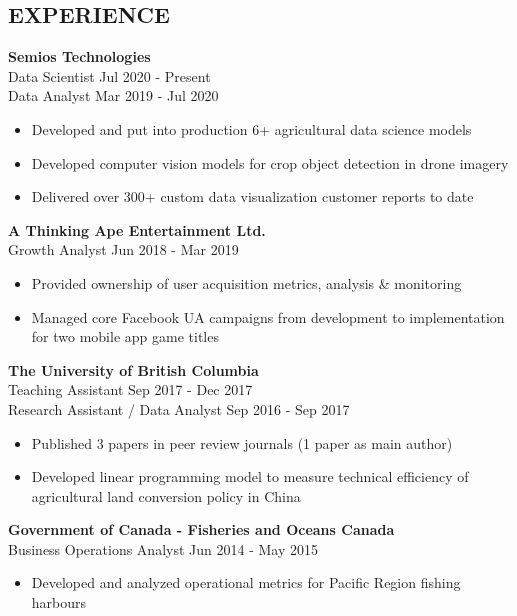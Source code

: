 \documentclass[margin]{res}
\begin{document}
\begin{resume}

\section{EXPERIENCE}

\textbf{Semios Technologies } 
    \\ Data Scientist \hfill{Jul 2020 - Present}
    \\ Data Analyst \hfill{Mar 2019 - Jul 2020}

\begin{itemize}
  \item Developed and put into production 6+ agricultural data science models
  \item Developed computer vision models for crop object detection in drone imagery 
  \item Delivered over 300+ custom data visualization customer reports to date 
\end{itemize}

\textbf{A Thinking Ape Entertainment Ltd.} 
    \\ Growth Analyst \hfill{Jun 2018 - Mar 2019}
\begin{itemize}
  \item Provided ownership of user acquisition metrics, analysis \& monitoring 
  \item Managed core Facebook UA campaigns from development to implementation for two mobile app game titles
\end{itemize}

\textbf{The University of British Columbia} 
    \\ Teaching Assistant \hfill{Sep 2017 - Dec 2017}
    \\ Research Assistant / Data Analyst \hfill{Sep 2016 - Sep 2017}

\begin{itemize}
  \item Published 3 papers in peer review journals (1 paper as main author)
  \item Developed linear programming model to measure technical efficiency of agricultural land conversion policy in China
\end{itemize}

\textbf{Government of Canada - Fisheries and Oceans Canada} 
    \\ Business Operations Analyst \hfill{Jun 2014 - May 2015}

\begin{itemize}
  \item Developed and analyzed operational metrics for Pacific Region fishing harbours 
\end{itemize}


\end{resume}
\end{document}
